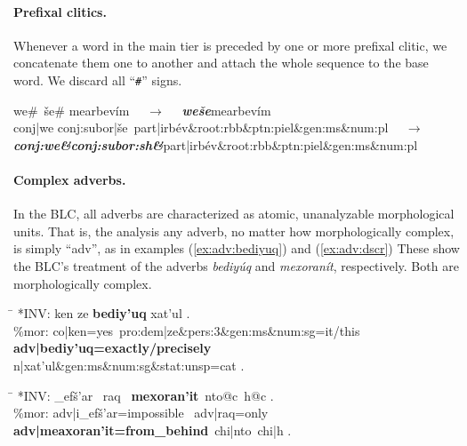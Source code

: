 \paragraph{Prefixal clitics.}
Whenever a word in the main tier is preceded by one or more prefixal clitic, we concatenate them one to another and attach the whole sequence to the base word. We discard all ``\texttt{\#}'' signs.
\begin{exe}\label{ex:preclitics}
	\ex
	\textsf{we\#\, \v{s}e\# mearbev\'im} $\quad\to\quad$ \textbf{\textit{\textsf{we\v{s}e}}}\textsf{mearbev\'im}\\
	\textsf{conj|we conj:subor|\v{s}e\, part|irb\'ev\&root:rbb\&ptn:piel\&gen:ms\&num:pl} $\quad\to\quad$  \\
	\textit{\textbf{\textsf{conj:we\&conj:subor:sh\&}}}\textsf{part|irb\'ev\&root:rbb\&ptn:piel\&gen:ms\&num:pl}
\end{exe}

\paragraph{Complex adverbs.} In the BLC, all adverbs are characterized as atomic, unanalyzable morphological units. That is,
the analysis any adverb, no matter how morphologically complex, is simply ``adv'', as in 
examples (\ref{ex:adv:bediyuq}) and (\ref{ex:adv:dscr})  These show the BLC's treatment of the adverbs \textit{\textsf{bediy\'{u}q}} and \textit{\textsf{mexoran\'{i}t}}, respectively. Both are 
morphologically complex.

\begin{exe}
\ex \label{ex:adv:bediyuq}
	\begin{tabbing}
	\hspace{0.6in} \= \hspace{5.5in} \kill
	\textsf{*INV:} \> \textsf{ken ze \textbf{bediy\a'{u}q} xat\a'{u}l .} \\
	\textsf{\%mor:} \> \textsf{co|ken=yes\, pro:dem|ze\&pers:3\&gen:ms\&num:sg=it/this} \\
				\> \textsf{\textbf{adv|bediy\a'{u}q=exactly/precisely}} \\
				\> \textsf{n|xat\a'{u}l\&gen:ms\&num:sg\&stat:unsp=cat .}
	\end{tabbing}
\ex \label{ex:adv:dscr}
	\begin{tabbing}
	\hspace{0.6in} \= \hspace{5.5in} \kill
	\textsf{*INV:} \> \textsf{\_{\textglotstop}{e}f\v{s}\a'{a}r \, raq \, \textbf{mexoran\a'{i}t}\, 
		nto@c\, h@c .} \\
	\textsf{\%mor:} \> \textsf{adv|{\textglotstop}i\_{\textglotstop}ef\v{s}\a'{a}r=impossible \, adv|raq=only}\\
	 \> \textsf{\textbf{adv|me{\textglotstop}axoran\a'{i}t=from\_behind}\, chi|nto\, chi|h .}
	\end{tabbing}
\end{exe}

